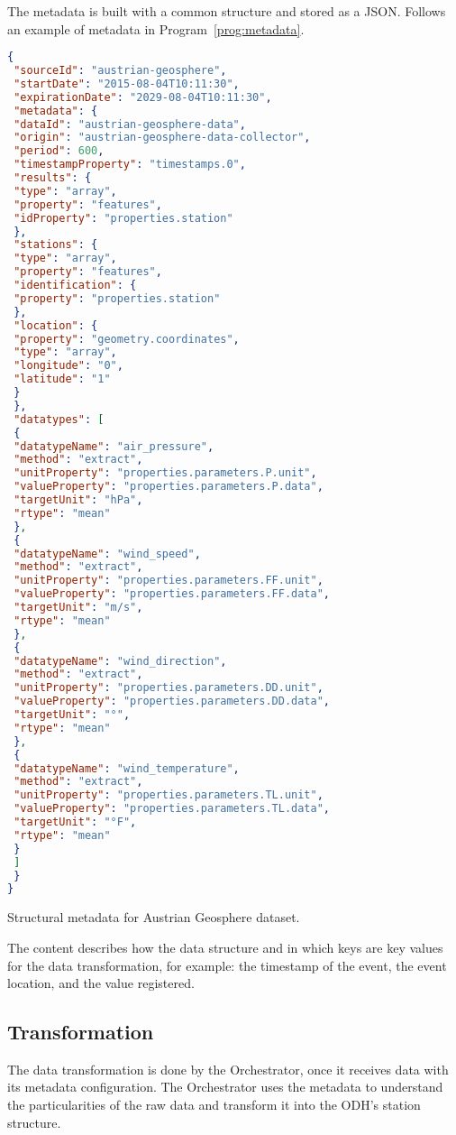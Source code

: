 The metadata is built with a common structure and stored as a JSON. Follows an example of metadata in Program~\ref{prog:metadata}.

\begin{program}
    \centering
  
  \begin{lstlisting}[language=JSON, style=wider]
{
 "sourceId": "austrian-geosphere",
 "startDate": "2015-08-04T10:11:30",
 "expirationDate": "2029-08-04T10:11:30",
 "metadata": {
 "dataId": "austrian-geosphere-data",
 "origin": "austrian-geosphere-data-collector",
 "period": 600,
 "timestampProperty": "timestamps.0",
 "results": {
 "type": "array",
 "property": "features",
 "idProperty": "properties.station"
 },
 "stations": {
 "type": "array",
 "property": "features",
 "identification": {
 "property": "properties.station"
 },
 "location": {
 "property": "geometry.coordinates",
 "type": "array",
 "longitude": "0",
 "latitude": "1"
 }
 },
 "datatypes": [
 {
 "datatypeName": "air_pressure",
 "method": "extract",
 "unitProperty": "properties.parameters.P.unit",
 "valueProperty": "properties.parameters.P.data",
 "targetUnit": "hPa",
 "rtype": "mean"
 },
 {
 "datatypeName": "wind_speed",
 "method": "extract",
 "unitProperty": "properties.parameters.FF.unit",
 "valueProperty": "properties.parameters.FF.data",
 "targetUnit": "m/s",
 "rtype": "mean"
 },
 {
 "datatypeName": "wind_direction",
 "method": "extract",
 "unitProperty": "properties.parameters.DD.unit",
 "valueProperty": "properties.parameters.DD.data",
 "targetUnit": "°",
 "rtype": "mean"
 },
 {
 "datatypeName": "wind_temperature",
 "method": "extract",
 "unitProperty": "properties.parameters.TL.unit",
 "valueProperty": "properties.parameters.TL.data",
 "targetUnit": "°F",
 "rtype": "mean"
 }
 ]
 }
}
  \end{lstlisting}
  
    \caption{Structural metadata for Austrian Geosphere dataset.\label{prog:metadata}}
\end{program}

The content describes how the data structure and in which keys are key values for the data transformation, for example: the timestamp of the event, the event location, and the value registered.

\subsection{Transformation}
\label{sec:transformation}

The data transformation is done by the Orchestrator, once it receives data with its metadata configuration. The Orchestrator uses the metadata to understand the particularities of the raw data and transform it into the ODH's station structure.

